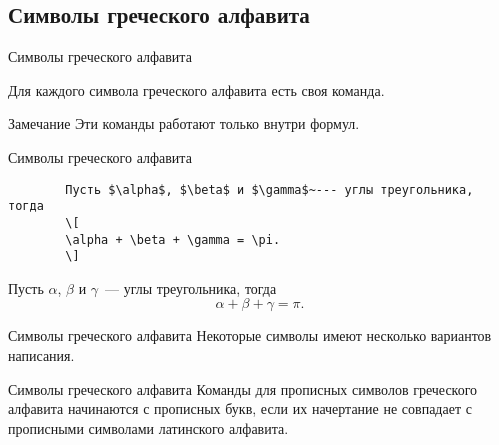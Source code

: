 \subsection{Символы греческого алфавита}

\begin{frame}{Символы греческого алфавита}
	
	Для каждого символа греческого алфавита есть своя команда.
	
	\large
	
	
		
	\normalfont
	
	\begin{exampleblock}{Замечание}
		Эти команды работают только внутри формул.
	\end{exampleblock}
	
\end{frame}


\begin{frame}[fragile=singleslide]{Символы греческого алфавита}

	\begin{verbatim}
		Пусть $\alpha$, $\beta$ и $\gamma$~--- углы треугольника, тогда
		\[
		\alpha + \beta + \gamma = \pi.
		\]
	\end{verbatim}

	\Large
	Пусть $\alpha$, $\beta$ и $\gamma$~--- углы треугольника, тогда
	\[
		\alpha + \beta + \gamma = \pi.
	\]
	
\end{frame}	

\begin{frame}{Символы греческого алфавита}
	Некоторые символы имеют несколько вариантов написания.
	
	\large
	
	
	
\end{frame}

\begin{frame}{Символы греческого алфавита}
	Команды для прописных символов греческого алфавита начинаются с прописных букв, если их начертание не совпадает с прописными символами латинского алфавита.
	\large
	
	
	
\end{frame}


